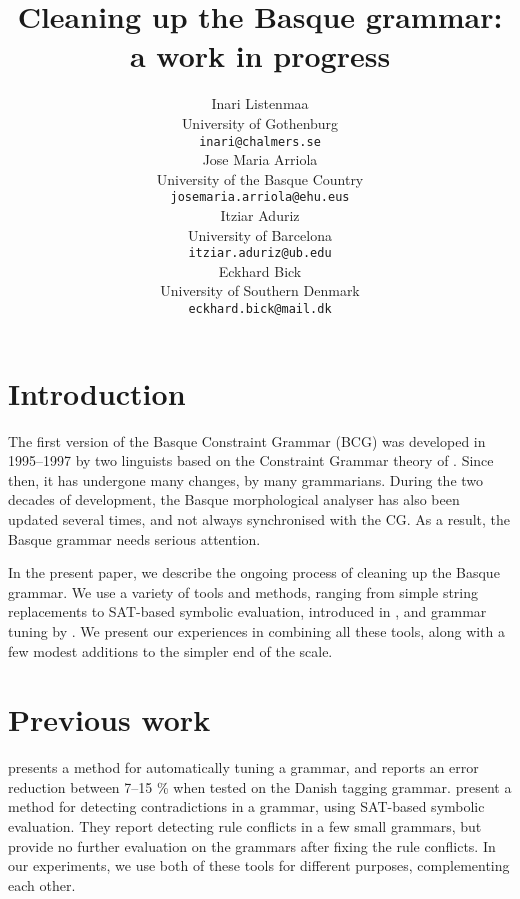 \documentclass[11pt]{article}
\title{Cleaning up the Basque grammar: a work in progress}
\author{Inari Listenmaa \\
   {\small University of Gothenburg} \\
   {\tt \small inari@chalmers.se} \\\And
   Jose Maria Arriola \\
   {\small University of the Basque Country} \\
   {\tt \small josemaria.arriola@ehu.eus} \\ \And
   Itziar Aduriz \\
   {\small University of Barcelona} \\
   {\tt \small itziar.aduriz@ub.edu} \\ \And
   Eckhard Bick \\
   {\small University of Southern Denmark} \\
   {\tt \small eckhard.bick@mail.dk} \\   
 }
\date{}
\begin{document}
\maketitle



\section{Introduction}

The first version of the Basque Constraint Grammar (BCG) was developed in 1995--1997 by two linguists \cite{aduriz1997euscg} based on the Constraint Grammar theory of .
Since then, it has undergone many changes, by many grammarians.
During the two decades of development, the Basque morphological analyser has also been updated several times, and not always synchronised with the CG. As a result, the Basque grammar needs serious attention.

In the present paper, we describe the ongoing process of cleaning up the Basque grammar. We use a variety of tools and methods, ranging from simple string replacements to SAT-based symbolic evaluation, introduced in , and grammar tuning by . We present our experiences in combining all these tools, along with a few modest additions to the simpler end of the scale.


\section{Previous work}

 presents a method for automatically tuning a grammar, and reports an error reduction between 7--15 \% when tested on the Danish tagging grammar.
 present a method for detecting contradictions in a grammar, using SAT-based symbolic evaluation.  They report detecting rule conflicts in a few small grammars, but provide no further evaluation on the grammars after fixing the rule conflicts. 
In our experiments, we use both of these tools for different purposes, complementing each other.
\end{document}
